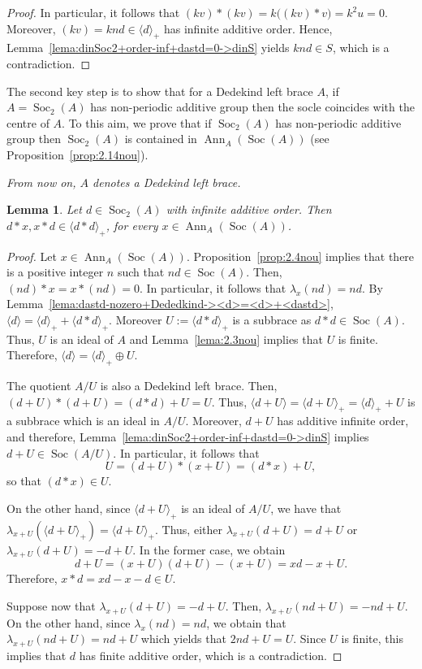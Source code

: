 \documentclass[12pt, a4paper, english]{article}
\newtheorem{lema}[teorema]{Lemma}
\theoremstyle{definition}
\DeclareMathOperator{\Ann}{Ann}
\DeclareMathOperator{\Soc}{Soc}
\begin{document}
\begin{proof}
In particular, it follows that $(kv) \ast (kv) = k\big((kv) \ast v\big) = k^2u = 0$.  Moreover, $(kv) = knd \in \langle d \rangle_+$ has infinite additive order. Hence,  Lemma~\ref{lema:dinSoc2+order-inf+dastd=0->dinS} yields $knd \in S$, which is a contradiction. 
\end{proof}

The second key step is to show that for a Dedekind left brace $A$, if $A = \Soc_2(A)$ has non-periodic additive group then the socle coincides with the centre of $A$. To this aim, we prove that if $\Soc_2(A)$ has non-periodic additive group then $\Soc_2(A)$ is contained in $\Ann_A(\Soc(A))$ (see Proposition~\ref{prop:2.14nou}).

\emph{From now on, $A$ denotes a Dedekind left brace.}


\begin{lema}
\label{lema:2.5nou}
Let $d \in \Soc_2(A)$ with infinite additive order. Then $d\ast x, x \ast d \in \langle d \ast d \rangle_+$, for every $x \in \Ann_A(\Soc(A))$.
\end{lema}

\begin{proof} 
Let $x \in \Ann_A(\Soc(A))$. Proposition~\ref{prop:2.4nou} implies that there is a positive integer $n$ such that $nd \in \Soc(A)$. Then, $(nd)\ast x = x \ast (nd) = 0$. In particular, it follows that $\lambda_x(nd) = nd$. By Lemma~\ref{lema:dastd-nozero+Dededkind-><d>=<d>+<dastd>}, $\langle d \rangle = \langle d \rangle_+ + \langle d \ast d \rangle_+$.  Moreover $U:= \langle d \ast d \rangle_+$ is a subbrace as $d\ast d \in \Soc(A)$. Thus, $U$ is an ideal of $A$ and Lemma~\ref{lema:2.3nou} implies that $U$ is finite. Therefore, $\langle d \rangle = \langle d\rangle_+ \oplus U$.

The quotient $A/U$ is also a Dedekind left brace. Then, $(d+U) \ast (d+U) = (d\ast d) + U = U$. Thus, $ \langle d+ U \rangle = \langle d + U \rangle_+ = \langle d\rangle_+ + U$ is a subbrace which is an ideal in $A/U$.  Moreover, $d+U$ has additive infinite order, and therefore,  Lemma~\ref{lema:dinSoc2+order-inf+dastd=0->dinS} implies $d+U \in \Soc(A/U)$.  In particular, it follows that 
\[ U = (d+U)\ast (x+U) = (d\ast x) + U,\]
so that $(d\ast x ) \in U$. 

On the other hand, since $\langle d +U\rangle_+$ is an ideal of $A/U$, we have that  $\lambda_{x+U}(\langle d + U \rangle_+) = \langle d + U \rangle_+$. Thus, either $\lambda_{x + U}(d+U) = d+U$ or $\lambda_{x+U}(d+U) =  -d+U$. In the former case, we obtain
\[ d+U = (x+U)(d+U) - (x+U) = xd - x + U.\]
Therefore, $x\ast d = xd - x -d \in  U$.

Suppose now that $\lambda_{x+U}(d+U) = -d + U$. Then, $\lambda_{x+U}(nd+U) = -nd+U$. On the other hand, since $\lambda_x(nd) = nd$, we obtain that $\lambda_{x+U}(nd+U) = nd+U$ which yields that $2nd + U = U$. Since $U$ is finite, this implies that $d$ has finite additive order, which is a contradiction.
\end{proof}
\end{document}
